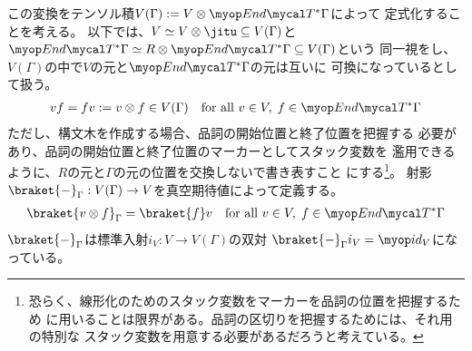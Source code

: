 {	この変換をテンソル積$V(\Gamma):=V\otimes\End\T^*\Gamma$によって
	定式化することを考える。
	以下では、$V\simeq V\otimes\jitu\subseteq V(\Gamma)$と
	$\End\T^*\Gamma\simeq R\otimes\End\T^*\Gamma\subseteq V(\Gamma)$という
	同一視をし、$V(\Gamma)$の中で$V$の元と$\End\T^*\Gamma$の元は互いに
	可換になっているとして扱う。
	\begin{equation*}\begin{split}
		vf = fv := v\otimes f\in V(\Gamma)
		\quad\text{for all } v\in V,\; f\in\End\T^*\Gamma
	\end{split}\end{equation*}
	ただし、構文木を作成する場合、品詞の開始位置と終了位置を把握する
	必要があり、品詞の開始位置と終了位置のマーカーとしてスタック変数を
	濫用できるように、$R$の元と$\Gamma$の元の位置を交換しないで書き表すこと
	にする\footnote{
		恐らく、線形化のためのスタック変数をマーカーを品詞の位置を把握するため
		に用いることは限界がある。品詞の区切りを把握するためには、それ用の特別な
		スタック変数を用意する必要があるだろうと考えている。
	}。
	射影$\braket{-}_\Gamma:V(\Gamma)\to V$を真空期待値によって定義する。
	\begin{equation*}\begin{split}
		\braket{v\otimes f}_\Gamma = \braket{f}v
		\quad\text{for all } v\in V,\; f\in\End\T^*\Gamma
	\end{split}\end{equation*}
	$\braket{-}_\Gamma$は標準入射$i_V:V\to V(\Gamma)$の双対
	$\braket{-}_\Gamma i_V=\id_V$になっている。

}
